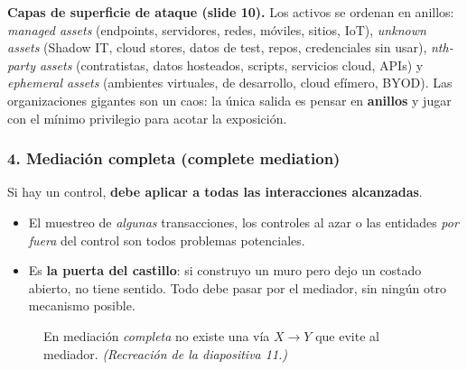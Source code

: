 \documentclass[11pt,a4paper]{article}
\begin{document}
\begin{slidebox}
\textbf{Capas de superficie de ataque (slide 10).} Los activos se ordenan en anillos:
\emph{managed assets} (endpoints, servidores, redes, móviles, sitios, IoT), \emph{unknown
assets} (Shadow IT, cloud stores, datos de test, repos, credenciales sin usar),
\emph{nth-party assets} (contratistas, datos hosteados, scripts, servicios cloud, APIs) y
\emph{ephemeral assets} (ambientes virtuales, de desarrollo, cloud efímero, BYOD). Las
organizaciones gigantes son un caos: la única salida es pensar en \textbf{anillos} y jugar con
el mínimo privilegio para acotar la exposición.
\end{slidebox}

\subsubsection{4. Mediación completa (complete mediation)}
Si hay un control, \textbf{debe aplicar a todas las interacciones alcanzadas}.
\begin{itemize}[leftmargin=1.4em,itemsep=1pt]
  \item El muestreo de \emph{algunas} transacciones, los controles al azar o las entidades
        \emph{por fuera} del control son todos problemas potenciales.
  \item Es \textbf{la puerta del castillo}: si construyo un muro pero dejo un costado abierto,
        no tiene sentido. Todo debe pasar por el mediador, sin ningún otro mecanismo posible.
\end{itemize}

\begin{figure}[h]
\centering
{}
\caption{En mediación \emph{completa} no existe una vía $X\to Y$ que evite al mediador.
\textit{(Recreación de la diapositiva 11.)}}
\end{figure}
\end{document}

